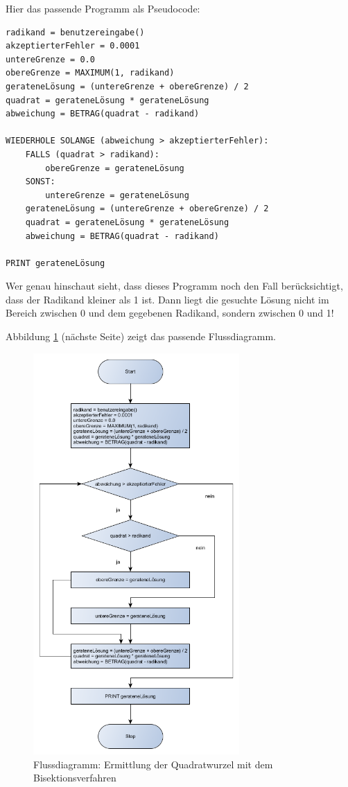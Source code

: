 Hier das passende Programm als Pseudocode:

\begin{lstlisting}
radikand = benutzereingabe()
akzeptierterFehler = 0.0001
untereGrenze = 0.0
obereGrenze = MAXIMUM(1, radikand)
gerateneLösung = (untereGrenze + obereGrenze) / 2
quadrat = gerateneLösung * gerateneLösung
abweichung = BETRAG(quadrat - radikand)

WIEDERHOLE SOLANGE (abweichung > akzeptierterFehler):
    FALLS (quadrat > radikand):
        obereGrenze = gerateneLösung
    SONST:
        untereGrenze = gerateneLösung
    gerateneLösung = (untereGrenze + obereGrenze) / 2
    quadrat = gerateneLösung * gerateneLösung
    abweichung = BETRAG(quadrat - radikand)

PRINT gerateneLösung
\end{lstlisting}

Wer genau hinschaut sieht, dass dieses Programm noch den Fall berücksichtigt,
dass der Radikand kleiner als 1 ist. Dann liegt die gesuchte Lösung nicht im
Bereich zwischen 0 und dem gegebenen Radikand, sondern zwischen 0 und 1!

Abbildung \ref{fig:flussdiagramm-wurzel-bisektion} (nächste Seite) zeigt das
passende Flussdiagramm.

\begin{figure}[h]
  \centering
   \includegraphics[width=0.7\textwidth]{./inf/SEKII/03_Informatik/Flussdiagramm_Wurzel_Bisektion.png}
   \caption{Flussdiagramm: Ermittlung der Quadratwurzel mit dem
   Bisektionsverfahren}
   \label{fig:flussdiagramm-wurzel-bisektion}
\end{figure}

